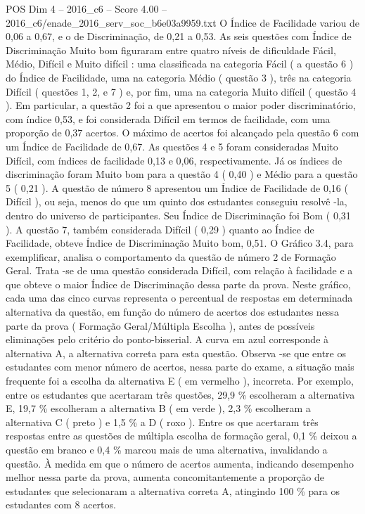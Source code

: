 \begin{textsample}{POS Dim 4 – 2016\_c6 – Score 4.00 – 2016\_c6/enade\_2016\_serv\_soc\_b6e03a9959.txt}
O Índice de Facilidade variou de 0,06 a 0,67, e o de Discriminação, de 0,21 a 0,53.
As seis questões com Índice de Discriminação Muito bom figuraram entre quatro níveis de dificuldade Fácil, Médio, Difícil e Muito difícil : uma classificada na categoria Fácil ( a questão 6 ) do Índice de Facilidade, uma na categoria Médio ( questão 3 ), três na categoria Difícil ( questões 1, 2, e 7 ) e, por fim, uma na categoria Muito difícil ( questão 4 ).
Em particular, a questão 2 foi a que apresentou o maior poder discriminatório, com índice 0,53, e foi considerada Difícil em termos de facilidade, com uma proporção de 0,37 acertos.
O máximo de acertos foi alcançado pela questão 6 com um Índice de Facilidade de 0,67.
As questões 4 e 5 foram consideradas Muito Difícil, com índices de facilidade 0,13 e 0,06, respectivamente.
Já os índices de discriminação foram Muito bom para a questão 4 ( 0,40 ) e Médio para a questão 5 ( 0,21 ).
A questão de número 8 apresentou um Índice de Facilidade de 0,16 ( Difícil ), ou seja, menos do que um quinto dos estudantes conseguiu resolvê -la, dentro do universo de participantes.
Seu Índice de Discriminação foi Bom ( 0,31 ).
A questão 7, também considerada Difícil ( 0,29 ) quanto ao Índice de Facilidade, obteve Índice de Discriminação Muito bom, 0,51.
O Gráfico 3.4, para exemplificar, analisa o comportamento da questão de número 2 de Formação Geral.
Trata -se de uma questão considerada Difícil, com relação à facilidade e a que obteve o maior Índice de Discriminação dessa parte da prova.
Neste gráfico, cada uma das cinco curvas representa o percentual de respostas em determinada alternativa da questão, em função do número de acertos dos estudantes nessa parte da prova ( Formação Geral/Múltipla Escolha ), antes de possíveis eliminações pelo critério do ponto-bisserial.
A curva em azul corresponde à alternativa A, a alternativa correta para esta questão.
Observa -se que entre os estudantes com menor número de acertos, nessa parte do exame, a situação mais frequente foi a escolha da alternativa E ( em vermelho ), incorreta.
Por exemplo, entre os estudantes que acertaram três questões, 29,9 \% escolheram a alternativa E, 19,7 \% escolheram a alternativa B ( em verde ), 2,3 \% escolheram a alternativa C ( preto ) e 1,5 \% a D ( roxo ).
Entre os que acertaram três respostas entre as questões de múltipla escolha de formação geral, 0,1 \% deixou a questão em branco e 0,4 \% marcou mais de uma alternativa, invalidando a questão.
À medida em que o número de acertos aumenta, indicando desempenho melhor nessa parte da prova, aumenta concomitantemente a proporção de estudantes que selecionaram a alternativa correta A, atingindo 100 \% para os estudantes com 8 acertos.

\end{textsample}
